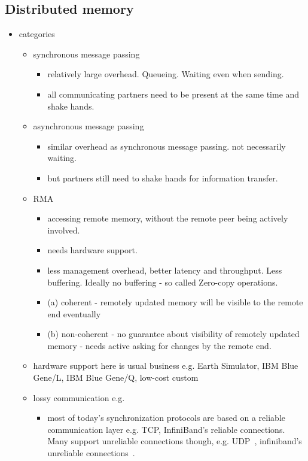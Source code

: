 \documentclass[a4paper, 10pt]{article}
\begin{document}
\subsection{Distributed memory}
\begin{itemize}
	\item categories
		\begin{itemize}
			\item synchronous message passing
				\begin{itemize}
					\item relatively large overhead. Queueing. Waiting even when sending.
					\item all communicating partners need to be present at the same time and shake hands.
				\end{itemize}
			\item asynchronous message passing
				\begin{itemize}
					\item similar overhead as synchronous message passing. not necessarily waiting.
					\item but partners still need to shake hands for information transfer.
				\end{itemize}
			\item RMA
				\begin{itemize}
					\item accessing remote memory, without the remote peer being actively involved.
					\item needs hardware support.
					\item less management overhead, better latency and throughput. Less buffering. Ideally no buffering - so called Zero-copy operations.
					\item (a) coherent - remotely updated memory will be visible to the remote end eventually
					\item (b) non-coherent - no guarantee about visibility of remotely updated memory - needs active asking for changes by the remote end.
				\end{itemize}
			\item hardware support here is usual business e.g. Earth Simulator\cite{earthsimulator}, IBM Blue Gene/L\cite{bluegenel}, IBM Blue Gene/Q\cite{bluegeneq}, low-cost custom\cite{hoefler2006b}
			\item lossy communication e.g.
				\begin{itemize}
					\item most of today's synchronization protocols are based on a reliable communication layer e.g. TCP, InfiniBand's reliable connections. Many support unreliable connections though, e.g. UDP~\cite{udp}, infiniband's unreliable connections~\cite{infiniband}.

\end{itemize}
\end{itemize}
\end{itemize}
\end{document}
